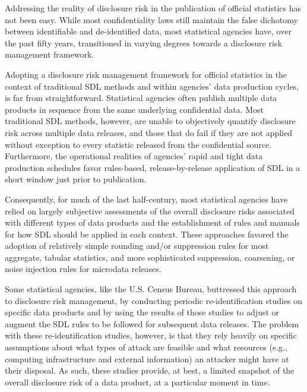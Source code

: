Addressing the reality of disclosure risk in the publication of official statistics has not been easy. While most confidentiality laws still maintain the false dichotomy between identifiable and de-identified data, most statistical agencies have, over the past fifty years, transitioned in varying degrees towards a disclosure risk management framework.

Adopting a disclosure risk management framework for official statistics in the context of traditional SDL methods and within agencies' data production cycles, is far from straightforward. Statistical agencies often publish multiple data products in sequence from the same underlying confidential data. Most traditional SDL methods, however, are unable to objectively quantify disclosure risk across multiple data releases, and those that do fail if they are not applied without exception to every statistic released from the confidential source. Furthermore, the operational realities of agencies' rapid and tight data production schedules favor rules-based, release-by-release application of SDL in a short window just prior to publication.

Consequently, for much of the last half-century, most statistical agencies have relied on largely subjective assessments of the overall disclosure risks associated with different types of data products and the establishment of rules and manuals for how SDL should be applied in each context. These approaches favored the adoption of relatively simple rounding and/or suppression rules for most aggregate, tabular statistics, and more sophisticated suppression, coarsening, or noise injection rules for microdata releases.

Some statistical agencies, like the U.S. Census Bureau, buttressed this approach to disclosure risk management, by conducting periodic re-identification studies on specific data products and by using the results of those studies to adjust or augment the SDL rules to be followed for subsequent data releases. The problem with these re-identification studies, however, is that they rely heavily on specific assumptions about what types of attack are feasible and what resources (e.g., computing infrastructure and external information) an attacker might have at their disposal. As such, these studies provide, at best, a limited snapshot of the overall disclosure risk of a data product, at a particular moment in time. 

